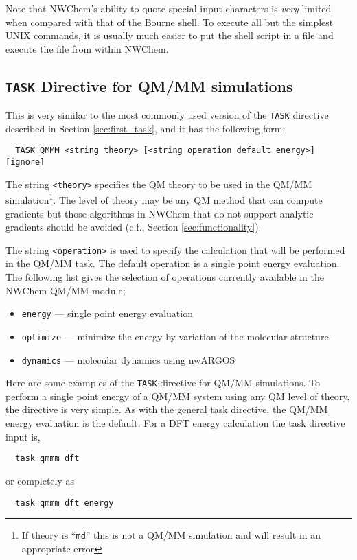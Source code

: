 Note that NWChem's ability to quote special input characters is {\em
  very} limited when compared with that of the Bourne shell.  To
execute all but the simplest UNIX commands, it is usually much easier
to put the shell script in a file and execute the file from within
NWChem.

\subsection{{\tt TASK} Directive for QM/MM simulations}

This is very similar to the most commonly used version of the
\verb+TASK+ directive described in Section \ref{sec:first_task}, and
it has the following form;

\begin{verbatim}
  TASK QMMM <string theory> [<string operation default energy>] [ignore]
\end{verbatim}

The string \verb+<theory>+ specifies the QM theory to be used in the
QM/MM simulation\footnote{If theory is ``{\tt md}'' this is not a QM/MM
simulation and will result in an appropriate error}.  The level of
theory may be any QM method that can compute gradients but those
algorithms in NWChem that do not support analytic gradients should be
avoided (c.f., Section \ref{sec:functionality}).  

The string \verb+<operation>+ is used to specify the calculation that will
be performed in the QM/MM task.  The default operation is a single point energy
evaluation.  The following list gives the selection of operations currently
available in the NWChem QM/MM module;
\begin{itemize}
\item \verb+energy+ --- single point energy evaluation
\item \verb+optimize+ --- minimize the energy by variation of the molecular
   structure.  
\item \verb+dynamics+ --- molecular dynamics using nwARGOS
\end{itemize}

Here are some examples of the \verb+TASK+ directive for QM/MM
simulations.  To perform a single point energy of a QM/MM system using
any QM level of theory, the directive is very simple. As with the
general task directive, the QM/MM energy evaluation is the
default. For a DFT energy calculation the task directive input is,
\begin{verbatim}
  task qmmm dft
\end{verbatim}
or completely as
\begin{verbatim}
  task qmmm dft energy
\end{verbatim}

